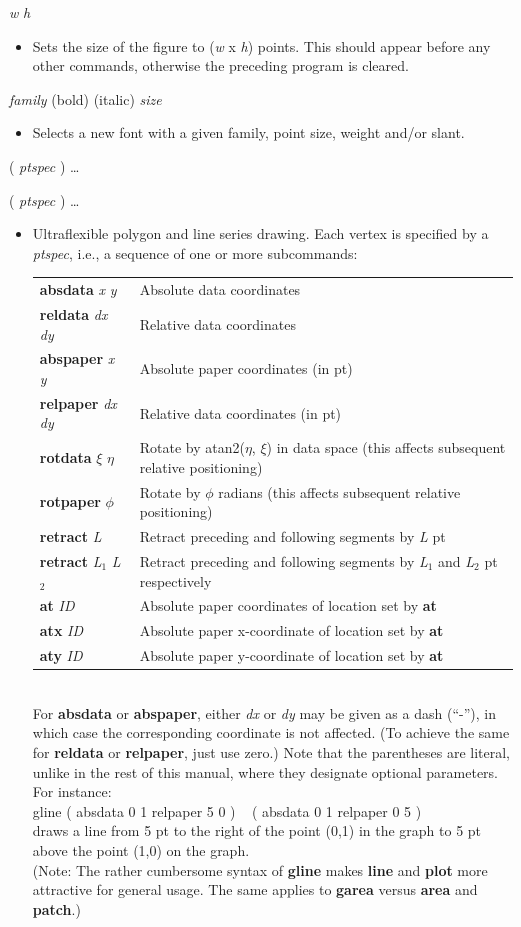 \documentclass[11pt]{article}
\def\cmd#1#2{\noindent {\bf #1} #2\par}
\def\expl#1{\kern-8pt\begin{itemize}\item[]#1\end{itemize}}
\def\cref#1{{\bf #1}}
\begin{document}
\cmd{figsize}{\emph{w} \emph{h}}
\expl{Sets the size of the figure to (\emph{w} x \emph{h})
  points. This should appear before any other commands, otherwise the
  preceding program is cleared.}

\cmd{font}{\emph{family} (bold) (italic) \emph{size}}
\expl{Selects a new font with a given family, point size, weight
  and/or slant.}

\cmd{garea}{( \emph{ptspec} ) \ldots}
\cmd{gline}{( \emph{ptspec} ) \ldots}
\expl{Ultraflexible polygon and line series drawing. 
  Each vertex is specified by a \emph{ptspec}, i.e., a sequence of one or
  more subcommands:\medskip\\
\mbox{}\kern10pt\begin{tabular}{lp{3.8in}}
{\bf absdata} \emph{x} \emph{y} & Absolute data coordinates \\
{\bf reldata} \emph{dx} \emph{dy} & Relative data coordinates \\
{\bf abspaper} \emph{x} \emph{y} & Absolute paper coordinates (in pt)\\
{\bf relpaper} \emph{dx} \emph{dy} & Relative data coordinates (in
               pt)\\
{\bf rotdata} $\xi$ $\eta$ & Rotate by atan2($\eta$, $\xi$) 
              in data space (this affects subsequent relative
              positioning) \\
{\bf rotpaper} $\phi$ & Rotate by $\phi$ radians (this affects
subsequent relative positioning) \\
{\bf retract} \emph{L} & Retract preceding and following segments by
              \emph{L} pt \\
{\bf retract} \emph{L$_1$} \emph{L$_2$} & Retract preceding and following
              segments by \emph{L$_1$} and \emph{L$_2$} pt
              respectively \\
{\bf at} \emph{ID} & Absolute paper coordinates of location set by \cref{at} \\              
{\bf atx} \emph{ID} & Absolute paper x-coordinate of location set by \cref{at} \\              
{\bf aty} \emph{ID} & Absolute paper y-coordinate of location set by \cref{at} \\              
\end{tabular}\medskip\\
For {\bf absdata} or {\bf abspaper}, either \emph{dx} or \emph{dy} may
be given as a dash (``-''), in which case the corresponding coordinate
is not affected. (To achieve the same for {\bf reldata} or {\bf
  relpaper}, just use zero.)
Note that the parentheses are literal, unlike in the rest of this manual, where
they designate optional parameters. For instance:\medskip\\
\mbox{}\kern15pt
       gline ( absdata 0 1 relpaper 5 0 ) ~ ( absdata 0 1 relpaper 0 5 )
\medskip\\
     draws a line from 5 pt to the right of the point (0,1) in the graph to
     5 pt above the point (1,0) on the graph.\\
(Note: The rather cumbersome syntax of \cref{gline} makes \cref{line}
     and \cref{plot} more attractive for general usage. The same
     applies to \cref{garea} versus \cref{area} and \cref{patch}.)
}
\end{document}
